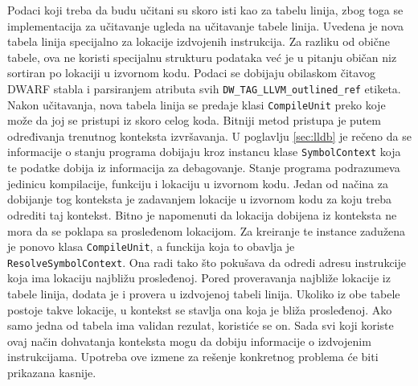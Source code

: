 \documentclass[12pt,oneside]{memoir}
\begin{document}
Podaci koji treba da budu učitani su skoro isti kao za tabelu linija, zbog toga se implementacija za učitavanje ugleda na učitavanje tabele linija.
Uvedena je nova tabela linija specijalno za lokacije izdvojenih instrukcija.
Za razliku od obične tabele, ova ne koristi specijalnu strukturu podataka već je u pitanju običan niz sortiran po lokaciji u izvornom kodu. %
Podaci se dobijaju obilaskom čitavog DWARF stabla i parsiranjem atributa svih \verb|DW_TAG_LLVM_outlined_ref| etiketa.
Nakon učitavanja, nova tabela linija se predaje klasi \verb|CompileUnit| preko koje može da joj se pristupi iz skoro celog koda.
Bitniji metod pristupa je putem određivanja trenutnog konteksta izvršavanja.
U poglavlju \ref{sec:lldb} je rečeno da se informacije o stanju programa dobijaju kroz instancu klase \verb|SymbolContext| koja te podatke dobija iz informacija za debagovanje.
Stanje programa podrazumeva jedinicu kompilacije, funkciju i lokaciju u izvornom kodu.
Jedan od načina za dobijanje tog konteksta je zadavanjem lokacije u izvornom kodu za koju treba odrediti taj kontekst.
Bitno je napomenuti da lokacija dobijena iz konteksta ne mora da se poklapa sa prosleđenom lokacijom.
Za kreiranje te instance zadužena je ponovo klasa \verb|CompileUnit|, a funckija koja to obavlja je \verb|ResolveSymbolContext|.
Ona radi tako što pokušava da odredi adresu instrukcije koja ima lokaciju najbližu prosleđenoj.
Pored proveravanja najbliže lokacije iz tabele linija, dodata je i provera u izdvojenoj tabeli linija.
Ukoliko iz obe tabele postoje takve lokacije, u kontekst se stavlja ona koja je bliža prosleđenoj.
Ako samo jedna od tabela ima validan rezulat, koristiće se on.
Sada svi koji koriste ovaj način dohvatanja konteksta mogu da dobiju informacije o izdvojenim instrukcijama.
Upotreba ove izmene za rešenje konkretnog problema će biti prikazana kasnije.
\end{document}
